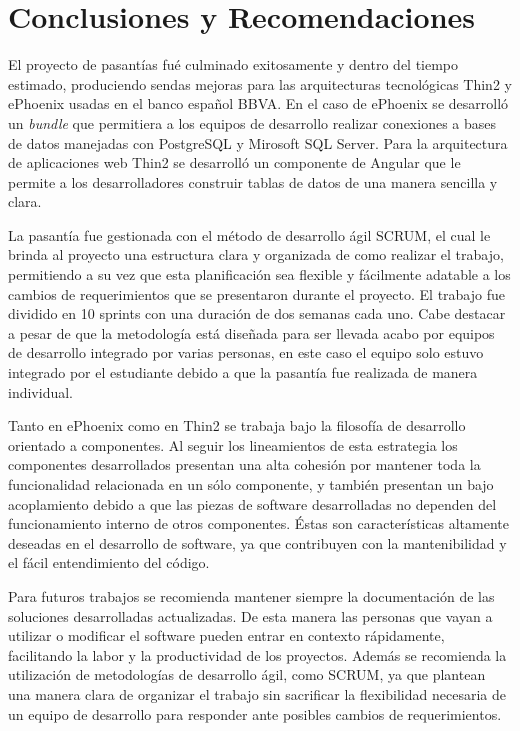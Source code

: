 \chapter{Conclusiones y Recomendaciones}
\label{conclusiones}

El proyecto de pasantías fué culminado exitosamente y dentro del tiempo
estimado, produciendo sendas mejoras para las arquitecturas tecnológicas
Thin2 y ePhoenix usadas en el banco español BBVA. En el caso de ePhoenix
se desarrolló un \emph{bundle} que permitiera a los equipos de desarrollo
realizar conexiones a bases de datos manejadas con PostgreSQL y Mirosoft SQL
Server. Para la arquitectura de aplicaciones web Thin2 se desarrolló un
componente de Angular que le permite a los desarrolladores construir tablas
de datos de una manera sencilla y clara.

La pasantía fue gestionada con el método de desarrollo ágil SCRUM, el
cual le brinda al proyecto una estructura clara y organizada de como realizar
el trabajo, permitiendo a su vez que esta planificación sea flexible y fácilmente
adatable a los cambios de requerimientos que se presentaron durante el proyecto.
El trabajo fue dividido en 10 sprints con una duración de dos semanas cada uno.
Cabe destacar a pesar de que la metodología está diseñada para ser llevada acabo
por equipos de desarrollo integrado por varias personas, en este caso el equipo
solo estuvo integrado por el estudiante debido a que la pasantía fue realizada
de manera individual.

Tanto en ePhoenix como en Thin2 se trabaja bajo la filosofía de desarrollo orientado
a componentes. Al seguir los lineamientos de esta estrategia los componentes desarrollados
presentan una alta cohesión por mantener toda la funcionalidad
relacionada en un sólo componente, y también presentan un bajo acoplamiento debido
a que las piezas de software desarrolladas no dependen del funcionamiento interno de otros
componentes. Éstas son características altamente deseadas en el desarrollo de software, ya que
contribuyen con la mantenibilidad y el fácil entendimiento del código.

Para futuros trabajos se recomienda mantener siempre la documentación de las soluciones
desarrolladas actualizadas. De esta manera las personas que vayan a utilizar o modificar
el software pueden entrar en contexto rápidamente, facilitando la labor y la productividad
de los proyectos. Además se recomienda la utilización de metodologías de desarrollo ágil,
como SCRUM, ya que plantean una manera clara de organizar el trabajo sin sacrificar
la flexibilidad necesaria de un equipo de desarrollo para responder ante posibles cambios de
requerimientos.
